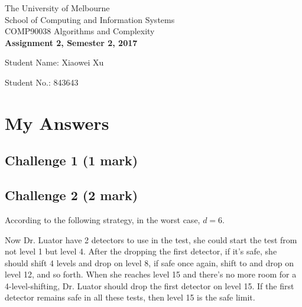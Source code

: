 \documentclass[11pt]{article}
\begin{document}
\begin{center}
{\sc The University of Melbourne
\\
School of Computing and Information Systems
\\
COMP90038 Algorithms and Complexity}
\bigskip \\
{\Large\bf Assignment 2, Semester 2, 2017}
\bigskip \\
{Student Name: Xiaowei Xu 

Student No.: 843643}
\end{center}
\section*{My Answers}
\subsection*{Challenge 1 \hfill {\small (1 mark)}}
\begin{center}
\end{center}

\subsection*{Challenge 2 \hfill {\small (2 mark)}}
According to the following strategy, in the worst case, $d = 6$.

Now Dr. Luator have 2 detectors to use in the test, she could start the test from not level 1
but level 4. After the dropping the first detector, if it's safe, she should shift 4 levels and 
drop on level 8, if safe once again, shift to and drop on level 12, and so forth.
When she reaches level 15 and there's no more room for a 4-level-shifting,
Dr. Luator should drop the first detector on level 15. If the first detector remains safe in all
these tests, then level 15 is the safe limit.
\end{document}
